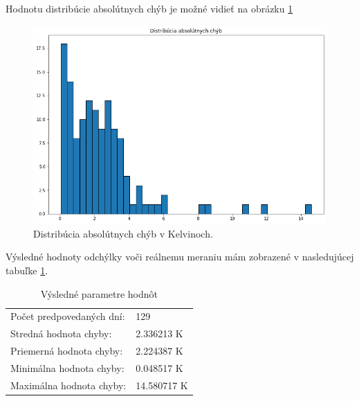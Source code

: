 \newline
Hodnotu distribúcie absolútnych chýb je možné vidieť na obrázku \ref{dest_abs_error}
\begin{figure}[!htbp]
  \centering
  \includegraphics[width=14cm]{img/dist_abs_chyby.png}
  \caption{Distribúcia absolútnych chýb v Kelvinoch.}
  \label{dest_abs_error}
\end{figure}

\newpage
Výsledné hodnoty odchýlky voči reálnemu meraniu mám zobrazené v nasledujúcej tabuľke \ref{tab_chyby}.
\newline
\begin{table}[]
\caption{Výsledné parametre hodnôt}
\label{tab_chyby}
\begin{tabular}{ll}
Počet predpovedaných dní: & 129       \\
Stredná hodnota chyby:    & 2.336213 K  \\
Priemerná hodnota chyby:  & 2.224387 K  \\
Minimálna hodnota chyby:  & 0.048517 K  \\
Maximálna hodnota chyby:  & 14.580717 K
\end{tabular}
\end{table}
